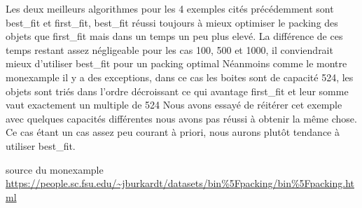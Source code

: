\documentclass{article}
\begin{document}
Les deux meilleurs algorithmes pour les 4 exemples cités précédemment sont best\_fit et first\_fit,
best\_fit réussi toujours à mieux optimiser le packing des objets que first\_fit mais dans un temps un peu plus elevé.
La différence de ces temps restant assez négligeable pour les cas 100, 500 et 1000, il conviendrait mieux d'utiliser best\_fit pour un packing optimal
Néanmoins comme le montre monexample il y a des exceptions, dans ce cas les boites sont de capacité 524,
les objets sont triés dans l'ordre décroissant ce qui avantage first\_fit et leur somme vaut exactement un multiple de 524
Nous avons essayé de réitérer cet exemple avec quelques capacités différentes nous avons pas réussi à obtenir la même chose.
Ce cas étant un cas assez peu courant à priori, nous aurons plutôt tendance à utiliser best\_fit.

source du monexample
\url{https://people.sc.fsu.edu/~jburkardt/datasets/bin\%5Fpacking/bin\%5Fpacking.html}
\end{document}
